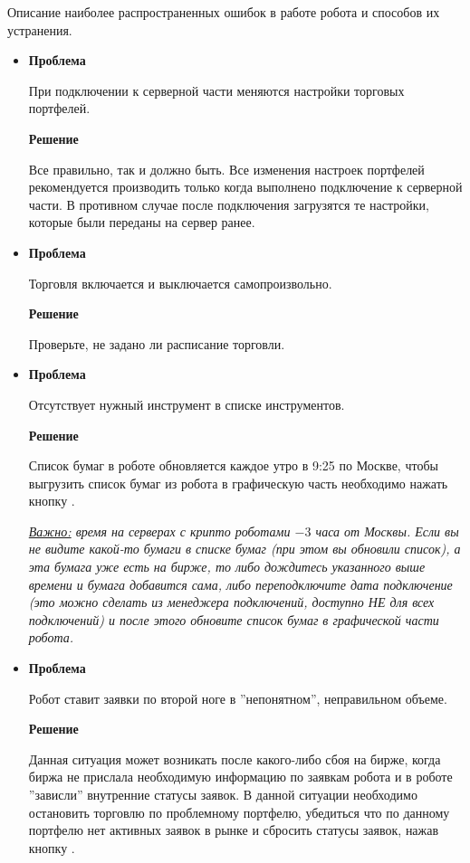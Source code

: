 Описание наиболее распространенных ошибок в работе робота и способов их устранения.
\begin{itemize}
\item \textbf{Проблема}

При подключении к серверной части меняются настройки торговых портфелей.

\textbf{Решение}

Все правильно, так и должно быть. Все изменения настроек портфелей рекомендуется производить только когда выполнено подключение к серверной части. В противном случае после подключения
загрузятся те настройки, которые были переданы на сервер ранее.
\item \textbf{Проблема}

Торговля включается и выключается самопроизвольно.

\textbf{Решение}

Проверьте, не задано ли расписание торговли.
\item  \textbf{Проблема}

Отсутствует нужный инструмент в списке инструментов.

\textbf{Решение}

Список бумаг в роботе обновляется каждое утро в 9:25 по Москве, чтобы выгрузить список бумаг из робота в графическую часть
необходимо нажать кнопку .

\noindent\textit{\underline{Важно:} время на серверах с крипто роботами $-3$ часа от Москвы. Если вы не видите какой-то бумаги в списке бумаг (при этом вы обновили список),
а эта бумага уже есть на бирже, то либо дождитесь указанного выше времени и бумага добавится сама, либо переподключите дата подключение (это можно сделать из менеджера подключений,
доступно НЕ для всех подключений) и после этого обновите список бумаг в графической части робота.}

%
%
%

\item  \textbf{Проблема}

Робот ставит заявки по второй ноге в ''непонятном'', неправильном объеме.

\textbf{Решение}

Данная ситуация может возникать после какого-либо сбоя на бирже, когда биржа не прислала необходимую информацию по заявкам робота и в роботе ''зависли'' внутренние статусы
заявок. В данной ситуации необходимо остановить торговлю по проблемному портфелю, убедиться что по данному портфелю нет активных заявок в рынке и сбросить статусы заявок,
нажав кнопку .

\end{itemize}

